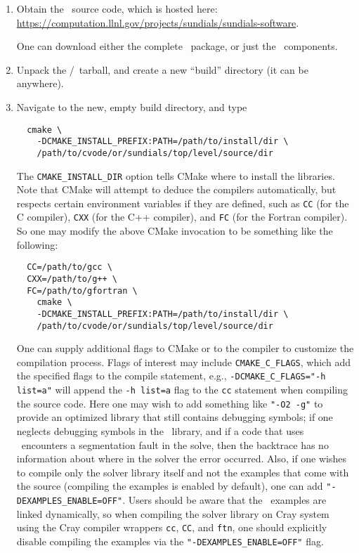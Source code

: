 \begin{enumerate}

  \item Obtain the \cvode\ source code, which is hosted here: \url{https://computation.llnl.gov/projects/sundials/sundials-software}.

  One can download either the complete \sundials\ package, or just the \cvode\ components.

  \item Unpack the \cvode/\sundials\ tarball, and create a new ``build'' directory (it can be anywhere).

  \item Navigate to the new, empty build directory, and type

  \begin{verbatim}
  cmake \
    -DCMAKE_INSTALL_PREFIX:PATH=/path/to/install/dir \
    /path/to/cvode/or/sundials/top/level/source/dir
  \end{verbatim}

  The \texttt{CMAKE\_INSTALL\_DIR} option tells CMake where to install the libraries.
  Note that CMake will attempt to deduce the compilers automatically, but respects certain environment variables if they are defined, such as \texttt{CC} (for the C compiler), \texttt{CXX} (for the C++ compiler), and \texttt{FC} (for the Fortran compiler).
  So one may modify the above CMake invocation to be something like the following:

  \begin{verbatim}
  CC=/path/to/gcc \
  CXX=/path/to/g++ \
  FC=/path/to/gfortran \
    cmake \
    -DCMAKE_INSTALL_PREFIX:PATH=/path/to/install/dir \
    /path/to/cvode/or/sundials/top/level/source/dir
  \end{verbatim}

  One can supply additional flags to CMake or to the compiler to customize the compilation process. 
  Flags of interest may include \texttt{CMAKE\_C\_FLAGS}, which add the specified flags to the compile statement, e.g.,
  \texttt{-DCMAKE\_C\_FLAGS="-h list=a"} will append the \texttt{-h list=a} flag to the \texttt{cc} statement when compiling the source code.
  Here one may wish to add something like \texttt{"-O2 -g"} to provide an optimized library that still contains debugging symbols; 
  if one neglects debugging symbols in the \cvode\ library, and if a code that uses \cvode\ encounters a segmentation fault in the solve, 
  then the backtrace has no information about where in the solver the error occurred.
  Also, if one wishes to compile only the solver library itself and not the examples that come with the source 
  (compiling the examples is enabled by default), one can add \texttt{"-DEXAMPLES\_ENABLE=OFF"}.
  Users should be aware that the \cvode\ examples are linked dynamically, so when compiling the solver library on Cray system using the Cray compiler wrappers \texttt{cc}, \texttt{CC}, and \texttt{ftn}, one should explicitly disable compiling the examples via the \texttt{"-DEXAMPLES\_ENABLE=OFF"} flag.


\end{enumerate}
